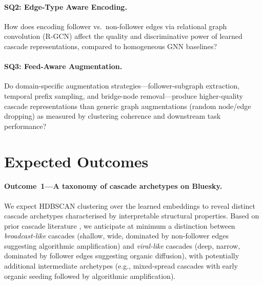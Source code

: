 \documentclass[12pt,a4paper]{article}
\begin{document}
\paragraph{SQ2: Edge-Type Aware Encoding.}
How does encoding follower vs.\ non-follower edges via relational graph
convolution (R-GCN) affect the quality and discriminative power of learned
cascade representations, compared to homogeneous GNN baselines?

\paragraph{SQ3: Feed-Aware Augmentation.}
Do domain-specific augmentation strategies---follower-subgraph extraction,
temporal prefix sampling, and bridge-node removal---produce higher-quality
cascade representations than generic graph augmentations (random node/edge
dropping) as measured by clustering coherence and downstream task performance?

\section{Expected Outcomes}

\paragraph{Outcome~1---A taxonomy of cascade archetypes on Bluesky.}
We expect HDBSCAN clustering over the learned embeddings to reveal distinct
cascade archetypes characterised by interpretable structural properties.
Based on prior cascade literature \citep{goel2016structural,
vosoughi2018spread}, we anticipate at minimum a distinction between
\emph{broadcast-like} cascades (shallow, wide, dominated by non-follower
edges suggesting algorithmic amplification) and \emph{viral-like} cascades
(deep, narrow, dominated by follower edges suggesting organic diffusion),
with potentially additional intermediate archetypes (e.g., mixed-spread
cascades with early organic seeding followed by algorithmic amplification).
\end{document}
